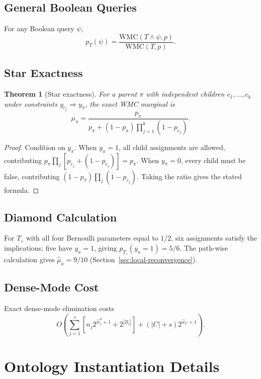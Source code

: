 \documentclass[12pt]{article}
\newtheorem{theorem}{Theorem}[section]
\begin{document}
\subsection{General Boolean Queries}

For any Boolean query $\psi$,
\[
  p_T(\psi) = \frac{\mathrm{WMC}(T\wedge\psi,p)}{\mathrm{WMC}(T,p)}.
\]

\subsection{Star Exactness}

\begin{theorem}[Star exactness]
\label{thm:star}
For a parent $\pi$ with independent children $c_1,\ldots,c_k$ under
constraints $y_{c_j}\Rightarrow y_\pi$, the exact WMC marginal is
\[
  \mu_\pi = \frac{p_\pi}{p_\pi + (1-p_\pi)\prod_{j=1}^k(1-p_{c_j})}.
\]
\end{theorem}

\begin{proof}
Condition on $y_\pi$. When $y_\pi=1$, all child assignments are
allowed, contributing $p_\pi\prod_j[p_{c_j}+(1-p_{c_j})] = p_\pi$.
When $y_\pi=0$, every child must be false, contributing
$(1-p_\pi)\prod_j(1-p_{c_j})$. Taking the ratio gives the stated formula.
\end{proof}

\subsection{Diamond Calculation}
\label{app:diamond-calculation}

For $T_\diamond$ with all four Bernoulli parameters equal to $1/2$,
six assignments satisfy the implications; five have $y_a=1$, giving
$p_{T_\diamond}(y_a=1) = 5/6$. The path-wise calculation gives
$\widehat\mu_a = 9/10$ (Section~\ref{sec:local-reconvergence}).

\subsection{Dense-Mode Cost}
\label{app:dense-cost}

Exact dense-mode elimination costs
\[
  O\!\left(
    \sum_{j=1}^s\!\left[n_j 2^{\widehat{w}_j^\partial+1}+2^{|B_j|}\right]
    + (|C|+s)2^{\widehat{w}_C+1}
  \right).
\]

\section{Ontology Instantiation Details}
\label{app:multi-ontology}
\end{document}
